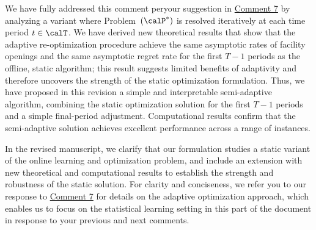 \documentclass[11pt]{article}
\begin{document}
We have fully addressed this comment peryour suggestion in \hyperref[R2:7]{\color{blue}Comment 7} by analyzing a variant where Problem~$(\calP^*)$ is resolved iteratively at each time period $t\in\calT$. We have derived new theoretical results that show that the adaptive re-optimization procedure achieve the same asymptotic rates of facility openings and the same asymptotic regret rate for the first $T-1$ periods as the offline, static algorithm; this result suggests limited benefits of adaptivity and therefore uncovers the strength of the static optimization formulation. Thus, we have proposed in this revision a simple and interpretable semi-adaptive algorithm, combining the static optimization solution for the first $T-1$ periods and a simple final-period adjustment. Computational results confirm that the semi-adaptive solution achieves excellent performance across a range of instances.

In the revised manuscript, we clarify that our formulation studies a static variant of the online learning and optimization problem, and include an extension with new theoretical and computational results to establish the strength and robustness of the static solution. For clarity and conciseness, we refer you to our response to \hyperref[R2:7]{\color{blue}Comment 7}  for details on the adaptive optimization approach, which enables us to focus on the statistical learning setting in this part of the document in response to your previous and next comments.
\end{document}

